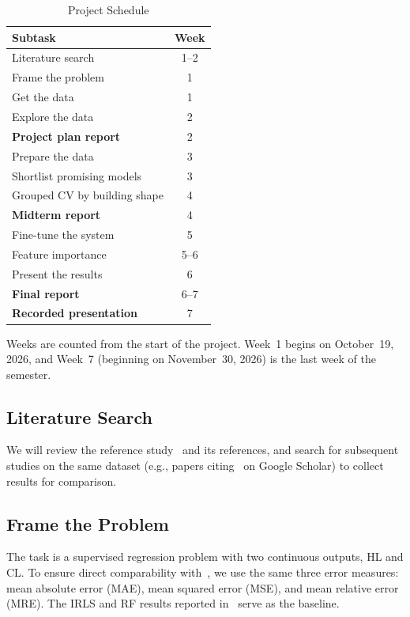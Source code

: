 \documentclass[journal]{IEEEtran}
\begin{document}
\begin{table}[!h]
\caption{Project Schedule}
\label{tab:schedule}
\centering
\begin{tabularx}{\columnwidth}{@{}Xc@{}}
\toprule
Subtask & Week \\
\midrule
Literature search               & 1--2 \\
Frame the problem               & 1    \\
Get the data                    & 1    \\
Explore the data                & 2    \\
\textbf{Project plan report}    & 2    \\
Prepare the data                & 3    \\
Shortlist promising models      & 3    \\
Grouped CV by building shape    & 4    \\
\textbf{Midterm report}         & 4    \\
Fine-tune the system            & 5    \\
Feature importance              & 5--6 \\
Present the results             & 6    \\
\textbf{Final report}           & 6--7 \\
\textbf{Recorded presentation}  & 7    \\
\bottomrule
\end{tabularx}

\vspace{2pt}
\footnotesize Weeks are counted from the start of the project. Week~1 begins on October~19, 2026,
and Week~7 (beginning on November~30, 2026) is the last week of the semester.
\end{table}

\subsection{Literature Search}
We will review the reference study~\cite{tsanas2012} and its references, and search for subsequent
studies on the same dataset (e.g., papers citing~\cite{tsanas2012} on Google Scholar) to collect results
for comparison.

\subsection{Frame the Problem}
The task is a supervised regression problem with two continuous outputs, HL and CL. To ensure direct
comparability with~\cite{tsanas2012}, we use the same three error measures: mean absolute error (MAE),
mean squared error (MSE), and mean relative error (MRE). The IRLS and RF results reported
in~\cite{tsanas2012} serve as the baseline.
\end{document}
